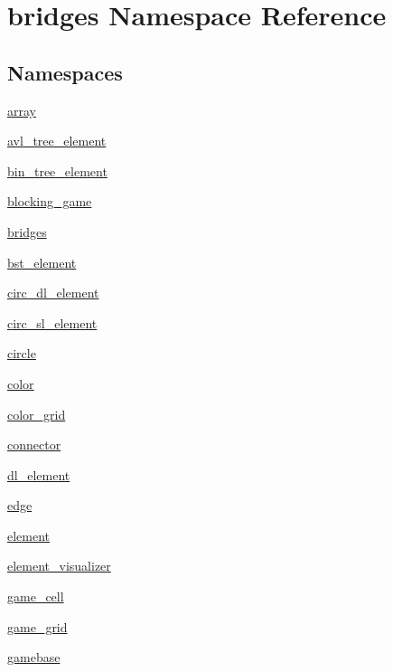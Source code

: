 \hypertarget{namespacebridges}{}\section{bridges Namespace Reference}
\label{namespacebridges}
\subsection*{Namespaces}
\begin{DoxyCompactItemize}
\item 
 \hyperlink{namespacebridges_1_1array}{array}
\item 
 \hyperlink{namespacebridges_1_1avl__tree__element}{avl\+\_\+tree\+\_\+element}
\item 
 \hyperlink{namespacebridges_1_1bin__tree__element}{bin\+\_\+tree\+\_\+element}
\item 
 \hyperlink{namespacebridges_1_1blocking__game}{blocking\+\_\+game}
\item 
 \hyperlink{namespacebridges_1_1bridges}{bridges}
\item 
 \hyperlink{namespacebridges_1_1bst__element}{bst\+\_\+element}
\item 
 \hyperlink{namespacebridges_1_1circ__dl__element}{circ\+\_\+dl\+\_\+element}
\item 
 \hyperlink{namespacebridges_1_1circ__sl__element}{circ\+\_\+sl\+\_\+element}
\item 
 \hyperlink{namespacebridges_1_1circle}{circle}
\item 
 \hyperlink{namespacebridges_1_1color}{color}
\item 
 \hyperlink{namespacebridges_1_1color__grid}{color\+\_\+grid}
\item 
 \hyperlink{namespacebridges_1_1connector}{connector}
\item 
 \hyperlink{namespacebridges_1_1dl__element}{dl\+\_\+element}
\item 
 \hyperlink{namespacebridges_1_1edge}{edge}
\item 
 \hyperlink{namespacebridges_1_1element}{element}
\item 
 \hyperlink{namespacebridges_1_1element__visualizer}{element\+\_\+visualizer}
\item 
 \hyperlink{namespacebridges_1_1game__cell}{game\+\_\+cell}
\item 
 \hyperlink{namespacebridges_1_1game__grid}{game\+\_\+grid}
\item 
 \hyperlink{namespacebridges_1_1gamebase}{gamebase}
\item 

\end{DoxyCompactItemize}
